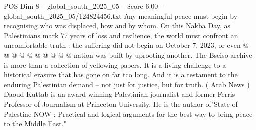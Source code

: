 \begin{textsample}{POS Dim 8 – global\_south\_2025\_05 – Score 6.00 – global\_south\_2025\_05/124824456.txt}
Any meaningful peace must begin by recognising who was displaced, how and by whom.
On this Nakba Day, as Palestinians mark 77 years of loss and resilience, the world must confront an uncomfortable truth : the suffering did not begin on October 7, 2023, or even @ @ @ @ @ @ @ @ @ @ nation was built by uprooting another.
The Bseiso archive is more than a collection of yellowing papers.
It is a living challenge to a historical erasure that has gone on far too long.
And it is a testament to the enduring Palestinian demand -- not just for justice, but for truth. ( Arab News ) Daoud Kuttab is an award-winning Palestinian journalist and former Ferris Professor of Journalism at Princeton University.
He is the author of"State of Palestine NOW : Practical and logical arguments for the best way to bring peace to the Middle East."

\end{textsample}
